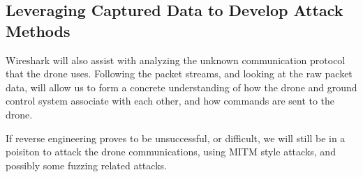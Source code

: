 \documentclass[IEEEtran,letterpaper,10pt,titlepage,draftclsnofoot,onecolumn]{article}
\begin{document}
\subsection*{Leveraging Captured Data to Develop Attack Methods}

Wireshark will also assist with analyzing the unknown communication protocol that the drone uses. Following the packet
streams, and looking at the raw packet data, will allow us to form a concrete understanding of how the drone and
ground control system associate with each other, and how commands are sent to the drone\cite{UknProto}.

If reverse engineering proves to be unsuccessful, or difficult, we will still be in a poisiton to attack the drone
communications, using MITM style attacks, and possibly some fuzzing related attacks\cite{Fuzzy}.

\newpage


\end{document}
